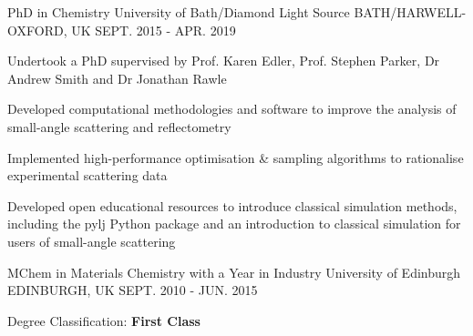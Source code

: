 \begin{cventries}
  \cventry
    {PhD in Chemistry}
    {University of Bath/Diamond Light Source}
    {BATH/HARWELL-OXFORD, UK}
    {SEPT. 2015 - APR. 2019}
    {
      \begin{cvitems}
        \item {Undertook a PhD supervised by Prof. Karen Edler, Prof. Stephen Parker, Dr Andrew Smith and Dr Jonathan Rawle}
        \item {Developed computational methodologies and software to improve the analysis of small-angle scattering and reflectometry}
        \item {Implemented high-performance optimisation \& sampling algorithms to rationalise experimental scattering data}
        \item {Developed open educational resources to introduce classical simulation methods, including the pylj Python package and an introduction to classical simulation for users of small-angle scattering}
      \end{cvitems}
    }
  \cventry
    {MChem in Materials Chemistry with a Year in Industry}
    {University of Edinburgh}
    {EDINBURGH, UK}
    {SEPT. 2010 - JUN. 2015}
    {
      \begin{cvitems}
        \item {Degree Classification: \textbf{First Class}}
      \end{cvitems}
    }
\end{cventries}
